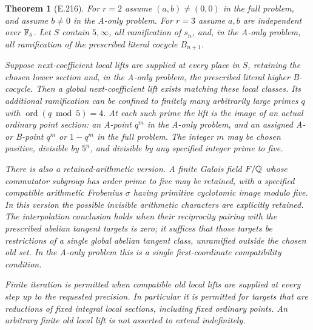 \documentclass[11pt]{article}
\newtheorem{theorem}{Theorem}
\begin{document}
\begin{theorem}[E.216]
For $r=2$ assume $(a,b)\ne(0,0)$ in the full problem, and assume $b\ne0$ in the A-only problem. For $r=3$ assume $a,b$ are independent over $\mathbb F_5$. Let $S$ contain $5,\infty$, all ramification of $s_n$, and, in the A-only problem, all ramification of the prescribed literal cocycle $B_{n+1}$.

Suppose next-coefficient local lifts are supplied at every place in $S$, retaining the chosen lower section and, in the A-only problem, the prescribed literal higher B-cocycle. Then a global next-coefficient lift exists matching these local classes. Its additional ramification can be confined to finitely many arbitrarily large primes $q$ with $\operatorname{ord}(q\bmod5)=4$. At each such prime the lift is the image of an actual ordinary point section: an A-point $q^m$ in the A-only problem, and an assigned A- or B-point $q^m$ or $1-q^m$ in the full problem. The integer $m$ may be chosen positive, divisible by $5^n$, and divisible by any specified integer prime to five.

There is also a retained-arithmetic version. A finite Galois field $F/\mathbb Q$ whose commutator subgroup has order prime to five may be retained, with a specified compatible arithmetic Frobenius $\sigma$ having primitive cyclotomic image modulo five. In this version the possible invisible arithmetic characters are explicitly retained. The interpolation conclusion holds when their reciprocity pairing with the prescribed abelian tangent targets is zero; it suffices that those targets be restrictions of a single global abelian tangent class, unramified outside the chosen old set. In the A-only problem this is a single first-coordinate compatibility condition.

Finite iteration is permitted when compatible old local lifts are supplied at every step up to the requested precision. In particular it is permitted for targets that are reductions of fixed integral local sections, including fixed ordinary points. An arbitrary finite old local lift is not asserted to extend indefinitely.
\end{theorem}
\end{document}
